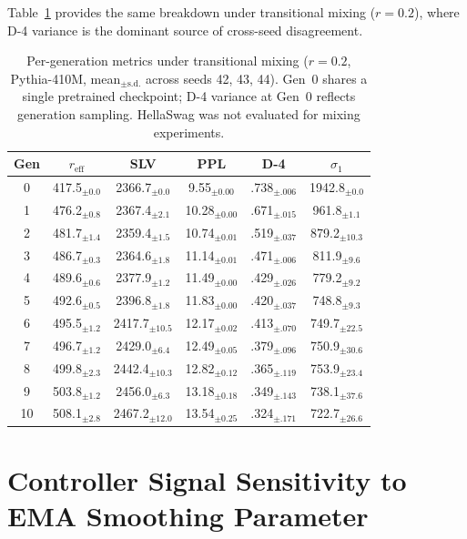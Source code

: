 Table~\ref{tab:pergen_variance_r02} provides the same breakdown under transitional mixing ($r{=}0.2$), where D-4 variance is the dominant source of cross-seed disagreement.

\begin{table}[!htb]
\centering
\small
\caption{Per-generation metrics under transitional mixing ($r{=}0.2$, Pythia-410M, mean$_{\pm\text{s.d.}}$ across seeds 42, 43, 44). Gen~0 shares a single pretrained checkpoint; D-4 variance at Gen~0 reflects generation sampling. HellaSwag was not evaluated for mixing experiments.}
\label{tab:pergen_variance_r02}
\setlength{\tabcolsep}{5pt}
\begin{tabular}{@{}cccccc@{}}
\toprule
Gen & $r_{\text{eff}}$ & SLV & PPL & D-4 & $\sigma_1$ \\
\midrule
 0 & 417.5$_{\pm0.0}$ & 2366.7$_{\pm0.0}$ & 9.55$_{\pm0.00}$ & .738$_{\pm.006}$ & 1942.8$_{\pm0.0}$ \\
 1 & 476.2$_{\pm0.8}$ & 2367.4$_{\pm2.1}$ & 10.28$_{\pm0.00}$ & .671$_{\pm.015}$ & 961.8$_{\pm1.1}$ \\
 2 & 481.7$_{\pm1.4}$ & 2359.4$_{\pm1.5}$ & 10.74$_{\pm0.01}$ & .519$_{\pm.037}$ & 879.2$_{\pm10.3}$ \\
 3 & 486.7$_{\pm0.3}$ & 2364.6$_{\pm1.8}$ & 11.14$_{\pm0.01}$ & .471$_{\pm.006}$ & 811.9$_{\pm9.6}$ \\
 4 & 489.6$_{\pm0.6}$ & 2377.9$_{\pm1.2}$ & 11.49$_{\pm0.00}$ & .429$_{\pm.026}$ & 779.2$_{\pm9.2}$ \\
 5 & 492.6$_{\pm0.5}$ & 2396.8$_{\pm1.8}$ & 11.83$_{\pm0.00}$ & .420$_{\pm.037}$ & 748.8$_{\pm9.3}$ \\
 6 & 495.5$_{\pm1.2}$ & 2417.7$_{\pm10.5}$ & 12.17$_{\pm0.02}$ & .413$_{\pm.070}$ & 749.7$_{\pm22.5}$ \\
 7 & 496.7$_{\pm1.2}$ & 2429.0$_{\pm6.4}$ & 12.49$_{\pm0.05}$ & .379$_{\pm.096}$ & 750.9$_{\pm30.6}$ \\
 8 & 499.8$_{\pm2.3}$ & 2442.4$_{\pm10.3}$ & 12.82$_{\pm0.12}$ & .365$_{\pm.119}$ & 753.9$_{\pm23.4}$ \\
 9 & 503.8$_{\pm1.2}$ & 2456.0$_{\pm6.3}$ & 13.18$_{\pm0.18}$ & .349$_{\pm.143}$ & 738.1$_{\pm37.6}$ \\
10 & 508.1$_{\pm2.8}$ & 2467.2$_{\pm12.0}$ & 13.54$_{\pm0.25}$ & .324$_{\pm.171}$ & 722.7$_{\pm26.6}$ \\
\bottomrule
\end{tabular}
\end{table}

\section{Controller Signal Sensitivity to EMA Smoothing Parameter}
\label{app:alpha_robustness}

